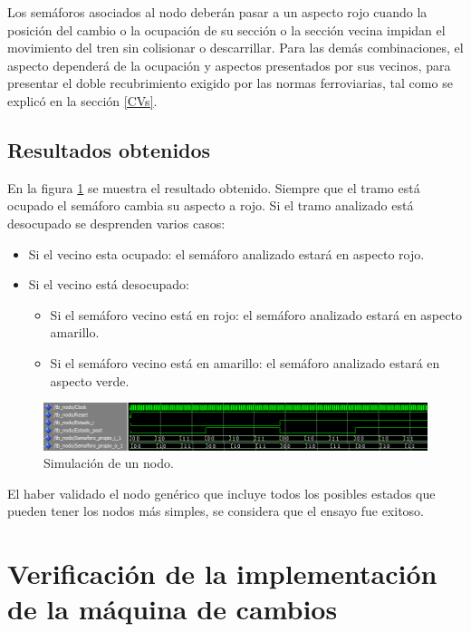		Los semáforos asociados al nodo deberán pasar a un aspecto rojo cuando la posición del cambio o la ocupación de su sección o la sección vecina impidan el movimiento del tren sin colisionar o descarrillar. Para las demás combinaciones, el aspecto dependerá de la ocupación y aspectos presentados por sus vecinos, para presentar el doble recubrimiento exigido por las normas ferroviarias, tal como se explicó en la sección \ref{CVs}.
			
		\subsection{Resultados obtenidos}
			
			En la figura \ref{fig:Test_Nodo} se muestra el resultado obtenido. Siempre que el tramo está ocupado el semáforo cambia su aspecto a rojo. Si el tramo analizado está desocupado se desprenden varios casos:
			
			\begin{itemize}
				\item Si el vecino esta ocupado: el semáforo analizado estará en aspecto rojo.
				\item Si el vecino está desocupado:
				\begin{itemize}
					\item Si el semáforo vecino está en rojo: el semáforo analizado estará en aspecto amarillo.
					\item Si el semáforo vecino está en amarillo:  el semáforo analizado estará en aspecto verde.
				\end{itemize}				 
			\end{itemize}
			
			\begin{figure}[h]
			\centering
			\includegraphics[scale=0.6]{./Figures/Test/Nodo}
				\caption{Simulación de un nodo.}
				\label{fig:Test_Nodo}
			\end{figure}
				
			El haber validado el nodo genérico que incluye todos los posibles estados que pueden tener los nodos más simples, se considera que el ensayo fue exitoso.	
	
\section{Verificación de la implementación de la máquina de cambios}

